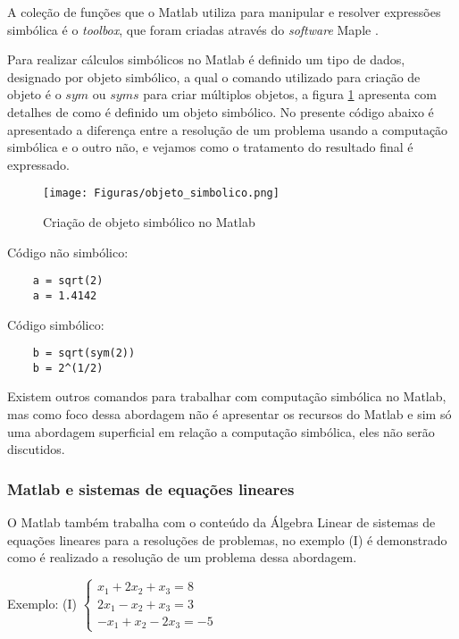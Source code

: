 A coleção de funções que o Matlab utiliza para manipular e resolver expressões simbólica é o \textit{toolbox}, que foram criadas através do \textit{software} Maple \cite{0000:Bernardo}. 

Para realizar cálculos simbólicos no Matlab é definido um tipo de dados, designado por objeto simbólico, a qual o comando utilizado para criação de objeto é o $sym$ ou $syms$ para criar múltiplos objetos, a figura \ref{objeto_simbolico} apresenta com detalhes de como é definido um objeto simbólico. No presente código abaixo é apresentado a diferença entre a resolução de um problema usando a computação simbólica e o outro não, e vejamos como o tratamento do resultado final é expressado.

\begin{figure}[!htb]
  \centering 
  \texttt{[image: Figuras/objeto\_simbolico.png]}
  \caption{Criação de objeto simbólico no Matlab \cite{2012:Amos}}
  \label{objeto_simbolico}
\end{figure}

Código não simbólico:
\begin{lstlisting}
    a = sqrt(2)
    a = 1.4142
\end{lstlisting}

Código simbólico:
\begin{lstlisting}
    b = sqrt(sym(2))
    b = 2^(1/2)
\end{lstlisting}

Existem outros comandos para trabalhar com computação simbólica no Matlab, mas como foco dessa abordagem não é apresentar os recursos do Matlab e sim só uma abordagem superficial em relação a computação simbólica, eles não serão discutidos.

\subsubsection{Matlab e sistemas de equações lineares}
\label{matlab_equacao_lineares}
\noindent O Matlab também trabalha com o conteúdo da Álgebra Linear de sistemas de equações lineares para a resoluções de problemas, no exemplo (I) é demonstrado como é realizado a resolução de um problema dessa abordagem.

\begin{center}
Exemplo: (I)
    $\left\{\begin{matrix}
        x_{1} + 2x_{2} + x_{3} = 8 \\ 
        2x_{1} - x_{2} + x_{3} = 3 \\ 
        -x_{1} + x_{2} - 2x_{3} = -5  
    \end{matrix}\right.$
\end{center}

